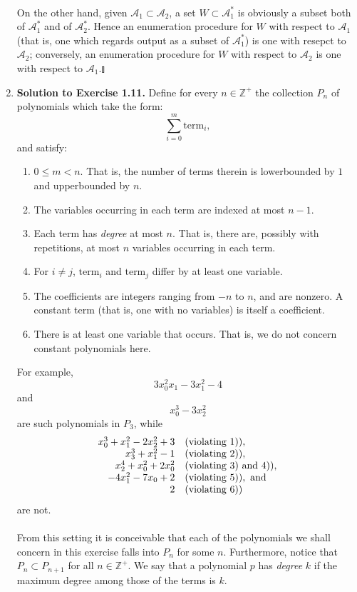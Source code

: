 \begin{enumerate}[1.]
\ \\
On the other hand, given $\mathcal{A}_1 \subset \mathcal{A}_2$, a set $W \subset \mathcal{A}_1^*$ is obviously a subset both of $\mathcal{A}_1^*$ and of $\mathcal{A}_2^*$. Hence an enumeration procedure for $W$ with respect to $\mathcal{A}_1$ (that is, one which regards output as a subset of $\mathcal{A}_1^*$) is one with resepct to $\mathcal{A}_2$; conversely, an enumeration procedure for $W$ with respect to $\mathcal{A}_2$ is one with respect to $\mathcal{A}_1$.\nolinebreak\hfill$\talloblong$
%
\item \textbf{Solution to Exercise 1.11.} Define for every $n \in \mathbb{Z}^+$ the collection $P_n$ of polynomials which take the form:
\[
\sum_{i = 0}^{m} \mbox{term}_i,
\]
and satisfy:
\begin{enumerate}[1)]
\item $0 \leq m < n$. That is, the number of terms therein is lowerbounded by $1$ and upperbounded by $n$.
\item The variables occurring in each term are indexed at most $n - 1$.
\item Each term has \emph{degree} at most $n$. That is, there are, possibly with repetitions, at most $n$ variables occurring in each term.
\item For $i \neq j$, $\mbox{term}_i$ and $\mbox{term}_j$ differ by at least one variable.
\item The coefficients are integers ranging from $-n$ to $n$, and are nonzero. A constant term (that is, one with no variables) is itself a coefficient.
\item There is at least one variable that occurs. That is, we do not concern constant polynomials here.
\end{enumerate}
For example,
\[
3 x_0^2 x_1 -3 x_1^2 -4
\]
and
\[
x_0^3 - 3 x_2^2
\]
are such polynomials in $P_3$, while
\[
\begin{array}{rl}
x_0^3 + x_1^2 - 2 x_2^2 + 3 & \mbox{(violating 1))}, \cr
x_3^3 + x_1^2 - 1 & \mbox{(violating 2))}, \cr
x_2^4 + x_0^2 + 2 x_0^2 & \mbox{(violating 3) and 4))}, \cr
-4 x_1^2 - 7 x_0 + 2 & \mbox{(violating 5))}, \mbox{ and} \cr
2 & \mbox{(violating 6))}
\end{array}
\]
are not.\\
\ \\
From this setting it is conceivable that each of the polynomials we shall concern in this exercise falls into $P_n$ for some $n$. Furthermore, notice that $P_n \subset P_{n + 1}$ for all $n \in \mathbb{Z}^+$. We say that a polynomial $p$ has \emph{degree} $k$ if the maximum degree among those of the terms is $k$.\\

\end{enumerate}
